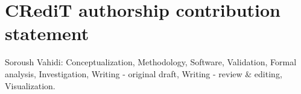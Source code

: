 \section*{CRediT authorship contribution statement}
Soroush Vahidi: Conceptualization, Methodology, Software, Validation, Formal analysis, Investigation, Writing - original draft, Writing - review \& editing, Visualization.
